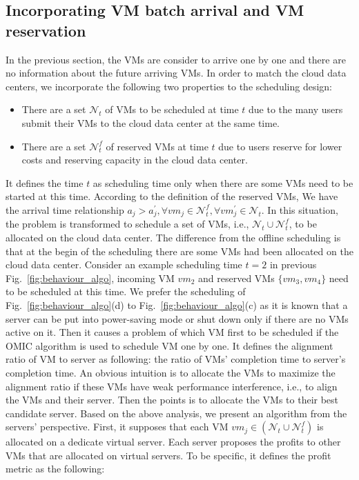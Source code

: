 \documentclass[10pt,journal]{IEEEtran}
\begin{document}
\subsection{Incorporating VM batch arrival and VM reservation}
In the previous section, the VMs are consider to arrive one by one and there are no information about the future arriving VMs. In order to match the cloud data centers, we incorporate the following two properties to the scheduling design:
\begin{itemize}
\item There are a set $\mathcal{N}_t$ of VMs to be scheduled at time $t$ due to the many users submit their VMs to the cloud data center at the same time.
\item There are a set $\mathcal{N}_t^f$ of reserved VMs at time $t$ due to users reserve for lower costs and reserving capacity in the cloud data center.  
\end{itemize}
It defines the time $t$ as scheduling time only when there are some VMs need to be started at this time. According to the definition of the reserved VMs, We have the arrival time relationship $a_j>a_j^{'}, \forall{vm_j}{\in}\mathcal{N}_t^f,\forall{vm_j^{'}}{\in}\mathcal{N}_t$. In this situation, the problem is transformed to schedule a set of VMs, i.e., $\mathcal{N}_t{\cup}\mathcal{N}_t^f$, to be allocated on the cloud data center. The difference from the offline scheduling is that at the begin of the scheduling there are some VMs had been allocated on the cloud data center. Consider an example scheduling time $t=2$ in previous Fig.~\ref{fig:behaviour_algo}, incoming VM $vm_2$ and reserved VMs $\{vm_3,vm_4\}$ need to be scheduled at this time. We prefer the scheduling of Fig.~\ref{fig:behaviour_algo}(d) to Fig.~\ref{fig:behaviour_algo}(c) as it is known that a server can be put into power-saving mode or shut down only if there are no VMs active on it. Then it causes a problem of which VM first to be scheduled if the OMIC algorithm is used to schedule VM one by one. It defines the alignment ratio of VM to server as following: the ratio of VMs{'} completion time to server's completion time. An obvious intuition is to allocate the VMs to maximize the alignment ratio if these VMs have weak performance interference, i.e., to align the VMs and their server. Then the points is to allocate the VMs to their best candidate server. Based on the above analysis, we present an algorithm from the servers' perspective. First, it supposes that each VM $vm_j{\in}(\mathcal{N}_t{\cup}\mathcal{N}_t^f)$ is allocated on a dedicate virtual server. Each server proposes the profits to other VMs that are allocated on virtual servers. To be specific, it defines the profit metric as the following:
\end{document}
